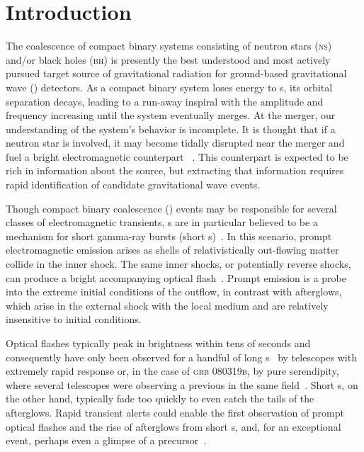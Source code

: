 \section{Introduction}
\label{sec:introduction}


The coalescence of compact binary systems consisting of neutron stars
 (\textsc{ns}) and/or black holes (\textsc{bh}) is presently the best
understood and most actively pursued target source of gravitational
radiation for ground-based gravitational wave (\GW{}) detectors.
As a compact binary system loses energy to \GW{}s, its
orbital separation decays, leading to a run-away inspiral with the \GW{}
amplitude and frequency increasing until the system eventually merges. At the
merger, our understanding of the system's behavior is incomplete. It is thought
that if a neutron star is involved, it may become tidally disrupted near
the merger and fuel a bright electromagnetic counterpart ~\cite{shibata:2007}.
This counterpart is expected to be rich in information about the source, but 
extracting that information requires rapid identification of candidate
gravitational wave events.

Though compact binary coalescence (\CBC{}) events may be responsible for several
 classes of electromagnetic transients, \CBC{}s are in particular believed to be a
mechanism for short gamma-ray bursts (short \GRB{}s)~\cite{Lee:2005, nakar07}.
In this scenario, prompt electromagnetic emission arises as shells of
 relativistically out-flowing matter collide in the inner shock.
The same inner shocks, or potentially reverse shocks, can produce a bright
 accompanying optical flash~\cite{Sari99}. Prompt emission is a probe into
 the extreme initial conditions of the outflow, in contrast with afterglows,
which arise in the external shock with the local medium and are relatively
insensitive to initial conditions. 

Optical flashes typically peak in brightness within tens of seconds and
consequently have only been observed for a handful of long
\GRB{}s~\cite{2011CRPhy..12..255A} by telescopes with extremely rapid response
or, in the case of \textsc{grb 080319b}, by pure serendipity, where several
telescopes were observing a previous \GRB{} in the same
field~\cite{2008Natur.455..183R}. Short \GRB{}s, on the other hand, typically
fade too quickly to even catch the tails of the afterglows. Rapid
\GW{} transient alerts could enable the first observation of
prompt optical flashes and the rise of afterglows from short \GRB{}s, and, for
an exceptional event, perhaps even a glimpse of a
precursor~\cite{0004-637X-723-2-1711}. 

